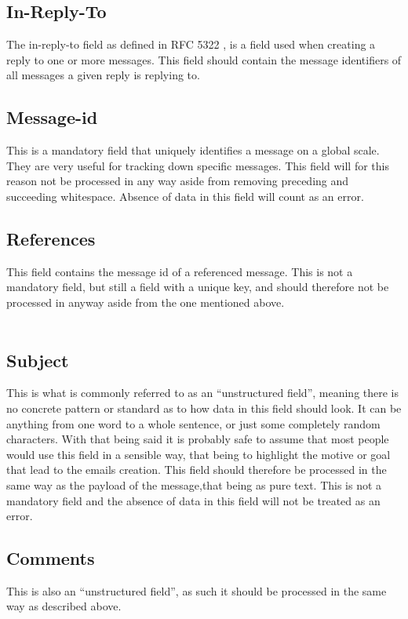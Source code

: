 \documentclass[a4paper,english]{report}
\begin{document}
\subsection{In-Reply-To}
The in-reply-to field as defined in RFC 5322 \cite{RFC5322}, is a field used when creating a reply to one or more messages. This field should contain the message identifiers of all messages a given reply is replying to.

\noindent
\subsection{Message-id}
This is a mandatory field that uniquely identifies a message on a global scale. They are very useful for tracking down specific messages. This field will for this reason not be processed in any way aside from removing preceding and succeeding whitespace.
Absence of data in this field will count as an error.\\
\noindent
\subsection{References}
This field contains the message id of a referenced message. This is not a mandatory field, but still a field with a unique key, and should therefore not be processed in anyway aside from the one mentioned above.\\\\

\noindent
\subsection{Subject}
This is what is commonly referred to as an “unstructured field”, meaning there is no concrete pattern or standard as to how data in this field should look. It can be anything from one word to a whole sentence, or just some completely random characters. With that being said it is probably safe to assume that most people would use this field in a sensible way, that being to highlight the motive or goal that lead to the emails creation.
This field should therefore be processed in the same way as the payload of the message,that being as pure text.
This is not a mandatory field and the absence of data in this field will not be treated as an error.\\

\noindent
\subsection{Comments} 
This is also an “unstructured field”, as such it should be processed in the same way as described above.\\
\noindent
\end{document}
